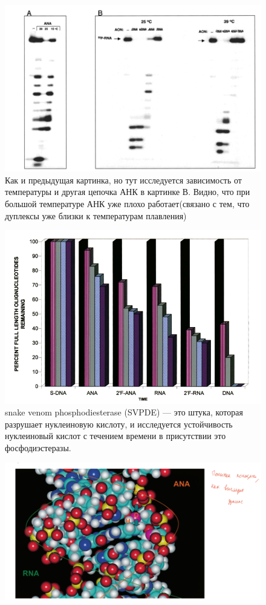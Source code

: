 	\begin{figure}[H]
		\centering
		\includegraphics[scale = 0.3]{Pictures/4_8}
		Как и предыдущая картинка, но тут исследуется зависимость от температуры и другая цепочка АНК в картинке В.
		Видно, что при большой температуре АНК уже плохо работает(связано с тем, что дуплексы уже близки к температурам плавления)
	\end{figure}
	\begin{figure}[H]
		\centering
		\includegraphics[scale = 0.3]{Pictures/4_9}
		\caption{snake venom phosphodiesterase (SVPDE) — это штука, которая разрушает нуклеиновую кислоту, и исследуется устойчивость нуклеиновый кислот с течением времени в присутствии это фосфодиэстеразы.}
	\end{figure}
	\begin{figure}[H]
		\centering
		\includegraphics[scale = 0.4]{Pictures/4_10}
		
	\end{figure}
